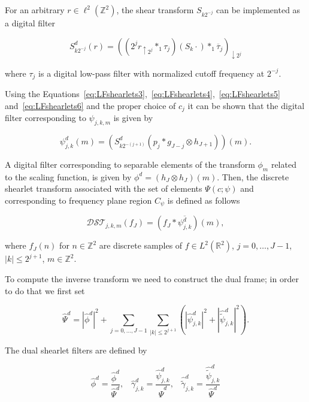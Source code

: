 \bigskip

For an arbitrary $r\in \ell^2(\mathbb{Z}^2)$, the shear transform $S_{k 2^{-j}}$ can be implemented as a digital filter

\begin{equation}
\label{eq:LFshearlets6}
S^d_{k 2^{-j}}(r)=((2^jr_{\uparrow 2^j}\ast_1\tau_j)(S_k\cdot)\ast_1\overline{\tau}_j)_{\downarrow 2^j}
\end{equation}

where $\tau_j$ is a digital low-pass filter with normalized cutoff frequency at $2^{-j}$. 

\bigskip

Using the Equations~\ref{eq:LFshearlets3},~\ref{eq:LFshearlets4},~\ref{eq:LFshearlets5} and~\ref{eq:LFshearlets6} and the proper choice of $c_j$ it can be shown that the digital filter corresponding to $\psi_{j,k,m}$ is given by

$$
\psi_{j,k}^d(m)=(S^d_{k2^{-(j+1)}}(p_j\ast g_{J-j}\otimes h_{J+1}))(m).
$$

A digital filter corresponding to separable elements of the transform $\phi_m$ related to the scaling function, is given by $\phi^d=(h_J\otimes h_J)(m)$. Then, the discrete shearlet transform associated with the set of elements $\Psi(c;\psi)$ and corresponding to frequency plane region $C_{\psi}$ is defined as follows

$$
\mathcal{DST}_{j,k,m}(f_J)=(f_J\ast \overline{\psi_{j,k}^d})(m),
$$

where $f_J(n)$ for $n\in\mathbb{Z}^2$ are discrete samples of $f\in L^2(\mathbb{R}^2)$, $j=0,\ldots,J-1$, $|k|\leq 2^{j+1}$, $m\in\mathbb{Z}^2$.

\bigskip

To compute the inverse transform we need to construct the dual frame; in order to do that we first set

$$
\hat{\Psi}^d=|\hat{\phi}^d|^2+\sum_{j=0,\ldots,J-1}\sum_{|k|\leq 2^{j+1}}(|\hat{\psi}^d_{j,k}|^2+|\hat{\tilde{\psi}}_{j,k}^d|^2).
$$ 

The dual shearlet filters are defined by

$$
\hat{\phi}^d=\frac{\hat{\phi}^d}{\hat{\Psi}^d}\textrm{,}\quad \hat{\gamma}^d_{j,k}=\frac{\hat{\psi}^d_{j,k}}{\hat{\Psi}^d}\textrm{,}\quad \hat{\tilde{\gamma}}^d_{j,k}=\frac{\hat{\tilde{\psi}}_{j,k}^d}{\hat{\Psi}^d}
$$

